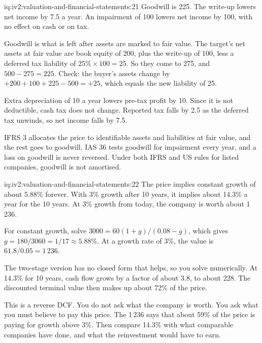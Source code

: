 \begin{solution}{iq:iv2:valuation-and-financial-statements:21}
Goodwill is 225. The write-up lowers net income by 7.5 a year. An impairment of 100 lowers net income by 100, with no effect on cash or on tax.

Goodwill is what is left after assets are marked to fair value. The target's net assets at fair value are book equity of 200, plus the write-up of 100, less a deferred tax liability of $25\% \times 100 = 25$. So they come to 275, and $500 - 275 = 225$. Check: the buyer's assets change by $+200 + 100 + 225 - 500 = +25$, which equals the new liability of 25.

Extra depreciation of 10 a year lowers pre-tax profit by 10. Since it is not deductible, cash tax does not change. Reported tax falls by 2.5 as the deferred tax unwinds, so net income falls by 7.5.

IFRS 3 allocates the price to identifiable assets and liabilities at fair value, and the rest goes to goodwill. IAS 36 tests goodwill for impairment every year, and a loss on goodwill is never reversed. Under both IFRS and US rules for listed companies, goodwill is not amortised.

\end{solution}

\begin{solution}{iq:iv2:valuation-and-financial-statements:22}
The price implies constant growth of about 5.88\% forever. With 3\% growth after 10 years, it implies about 14.3\% a year for the 10 years. At 3\% growth from today, the company is worth about 1\,236.

For constant growth, solve $3000 = 60(1 + g)/(0.08 - g)$, which gives $g = 180/3060 = 1/17 \approx 5.88\%$. At a growth rate of 3\%, the value is $61.8/0.05 = 1\,236$.

The two-stage version has no closed form that helps, so you solve numerically. At 14.3\% for 10 years, cash flow grows by a factor of about 3.8, to about 228. The discounted terminal value then makes up about 72\% of the price.

This is a reverse DCF. You do not ask what the company is worth. You ask what you must believe to pay this price. The 1\,236 says that about 59\% of the price is paying for growth above 3\%. Then compare 14.3\% with what comparable companies have done, and what the reinvestment would have to earn.

\end{solution}

